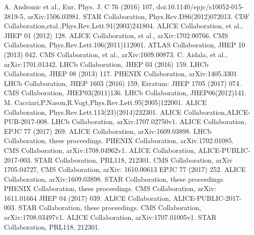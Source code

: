 \documentclass{webofc}
\begin{document}
\begin{thebibliography}{}
 A. Andronic et al., Eur. Phys. J. C 76 (2016) 107, doi:10.1140/epjc/s10052-015-3819-5, arXiv:1506.03981. 
 STAR Collaboration, Phys.Rev.D86(2012)072013.
 CDF Collaboration,etal.,Phys.Rev.Lett.91(2003)241804.
 ALICE Collaboration, et al., JHEP 01 (2012) 128.
 ALICE Collaboration, et al., arXiv:1702.00766.
 CMS Collaboration, Phys.Rev.Lett.106(2011)112001.
 ATLAS Collaboration, JHEP 10 (2013) 042.
 CMS Collaboration, et al., arXiv:1609.00873.
 C. Aidala, et al., arXiv:1701.01342.
 LHCb Collaboration, JHEP 03 (2016) 159.
 LHCb Collaboration, JHEP 08 (2013) 117.
 PHENIX Collaboration, arXiv:1405.3301
 LHCb Collaboration, JHEP 1603 (2016) 159, Erratum: JHEP 1705 (2017) 074.
 CMS Collaboration, JHEP03(2011)136.
 LHCb Collaboration, JHEP06(2012)141.
 M. Cacciari,P.Nason,R.Vogt,Phys.Rev.Lett.95(2005)122001.
 ALICE Collaboration, Phys.Rev.Lett.113(23)(2014)232301. 
 ALICE Collaboration,ALICE-PUB-2017-008. 
 LHCb Collaboration, arXiv:1707.02750v1.
 ALICE Collaboration, EPJC 77 (2017) 269.
 ALICE Collaboration, arXiv:1609.03898.
 LHCb Collaboration, these proceedings.
 PHENIX Collaboration, arXiv.1702.01085.
 CMS Collaboration, arXiv:1708.04962v1.
 ALICE Collaboration, ALICE-PUBLIC-2017-003.
 STAR Collaboration, PRL118, 212301.
 CMS Collaboration, arXiv 1705.04727,
 CMS Collaboration, arXiv: 1610.00613 EPJC 77 (2017) 252.
 ALICE Collaboration, arXiv:1609.03898.
 STAR Collaboration, these proceedings.
 PHENIX Collaboration, these proceedings.
 CMS Collaboration, arXiv: 1611.01664 JHEP 04 (2017) 039.
 ALICE Collaboration, ALICE-PUBLIC-2017-003.
 STAR Collaboration, these proceedings.
 CMS Collaboration, arXiv:1708.03497v1.
 ALICE Collaboration, arXiv:1707.01005v1.
 STAR Collaboration, PRL118, 212301.

\end{thebibliography}
\end{document}

